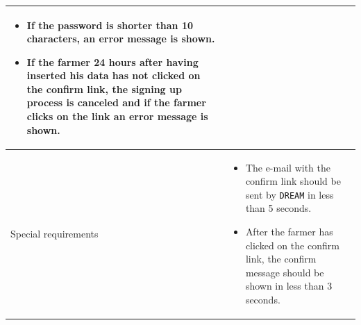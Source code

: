 \documentclass{article}
\begin{document}
\begin{longtable}{|p{3.5cm}|m{8cm}|}
\begin{itemize}
     \item If the password is shorter than 10 characters, an error message is shown.
     \item If the farmer 24 hours after having inserted his data has not clicked on the confirm link, the signing up process is canceled and if the farmer clicks on the link an error message is shown.
 \end{itemize}\\
 \hline
 Special requirements &
 \begin{itemize}
     \item The e-mail with the confirm link should be sent by \verb|DREAM| in less than 5 seconds.
     \item After the farmer has clicked on the confirm link, the confirm message should be shown in less than 3 seconds.
 \end{itemize}\\
 \hline
\end{longtable}
\end{document}
